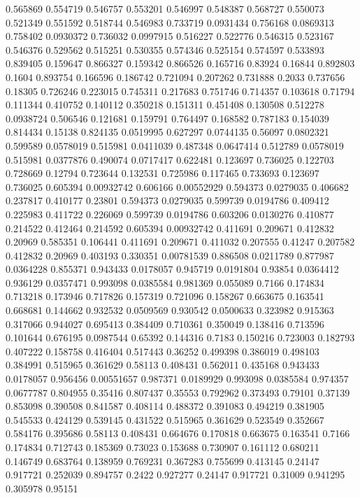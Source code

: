 0.565869 0.554719
0.546757 0.553201
0.546997 0.548387
0.568727 0.550073
0.521349 0.551592
0.518744 0.546983
0.733719 0.0931434
0.756168 0.0869313
0.758402 0.0930372
0.736032 0.0997915
0.516227 0.522776
0.546315 0.523167
0.546376 0.529562
0.515251 0.530355
0.574346 0.525154
0.574597 0.533893
0.839405 0.159647
0.866327 0.159342
0.866526 0.165716
0.83924 0.16844
0.892803 0.1604
0.893754 0.166596
0.186742 0.721094
0.207262 0.731888
0.2033 0.737656
0.18305 0.726246
0.223015 0.745311
0.217683 0.751746
0.714357 0.103618
0.71794 0.111344
0.410752 0.140112
0.350218 0.151311
0.451408 0.130508
0.512278 0.0938724
0.506546 0.121681
0.159791 0.764497
0.168582 0.787183
0.154039 0.814434
0.15138 0.824135
0.0519995 0.627297
0.0744135 0.56097
0.0802321 0.599589
0.0578019 0.515981
0.0411039 0.487348
0.0647414 0.512789
0.0578019 0.515981
0.0377876 0.490074
0.0717417 0.622481
0.123697 0.736025
0.122703 0.728669
0.12794 0.723644
0.132531 0.725986
0.117465 0.733693
0.123697 0.736025
0.605394 0.00932742
0.606166 0.00552929
0.594373 0.0279035
0.406682 0.237817
0.410177 0.23801
0.594373 0.0279035
0.599739 0.0194786
0.409412 0.225983
0.411722 0.226069
0.599739 0.0194786
0.603206 0.0130276
0.410877 0.214522
0.412464 0.214592
0.605394 0.00932742
0.411691 0.209671
0.412832 0.20969
0.585351 0.106441
0.411691 0.209671
0.411032 0.207555
0.41247 0.207582
0.412832 0.20969
0.403193 0.330351
0.00781539 0.886508
0.0211789 0.877987
0.0364228 0.855371
0.943433 0.0178057
0.945719 0.0191804
0.93854 0.0364412
0.936129 0.0357471
0.993098 0.0385584
0.981369 0.055089
0.7166 0.174834
0.713218 0.173946
0.717826 0.157319
0.721096 0.158267
0.663675 0.163541
0.668681 0.144662
0.932532 0.0509569
0.930542 0.0500633
0.323982 0.915363
0.317066 0.944027
0.695413 0.384409
0.710361 0.350049
0.138416 0.713596
0.101644 0.676195
0.0987544 0.65392
0.144316 0.7183
0.150216 0.723003
0.182793 0.407222
0.158758 0.416404
0.517443 0.36252
0.499398 0.386019
0.498103 0.384991
0.515965 0.361629
0.58113 0.408431
0.562011 0.435168
0.943433 0.0178057
0.956456 0.00551657
0.987371 0.0189929
0.993098 0.0385584
0.974357 0.0677787
0.804955 0.35416
0.807437 0.35553
0.792962 0.373493
0.79101 0.37139
0.853098 0.390508
0.841587 0.408114
0.488372 0.391083
0.494219 0.381905
0.545533 0.424129
0.539145 0.431522
0.515965 0.361629
0.523549 0.352667
0.584176 0.395686
0.58113 0.408431
0.664676 0.170818
0.663675 0.163541
0.7166 0.174834
0.712743 0.185369
0.73023 0.153688
0.730907 0.161112
0.680211 0.146749
0.683764 0.138959
0.769231 0.367283
0.755699 0.413145
0.24147 0.917721
0.252039 0.894757
0.2422 0.927277
0.24147 0.917721
0.31009 0.941295
0.305978 0.95151
